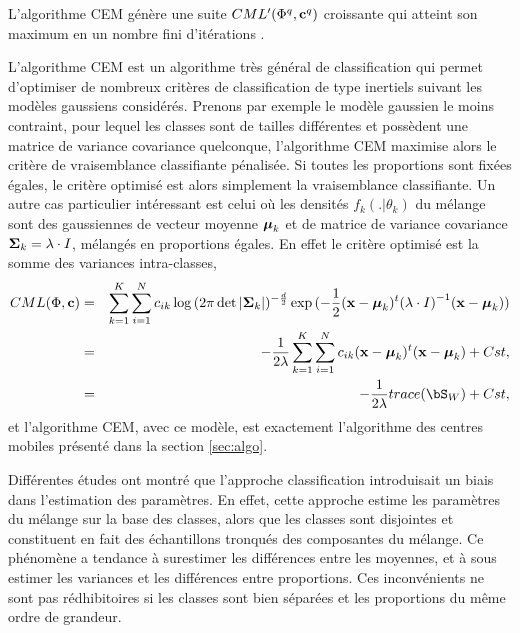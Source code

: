 L'algorithme CEM g\'en\`ere une suite $CML'(\Phi^q,\mbox{\bf c}^q)$ croissante qui
atteint son maximum en un nombre fini d'it\'erations \cite{Celeux1992a}.




L'algorithme CEM est un algorithme tr\`es g\'en\'eral de classification
qui permet d'optimiser de nombreux crit\`eres de classification de 
type inertiels suivant les mod\`eles gaussiens consid\'er\'es.
Prenons par exemple le mod\`ele 
gaussien le moins contraint, pour lequel les classes sont de tailles 
diff\'erentes et poss\`edent une
matrice de variance covariance quelconque,
l'algorithme CEM maximise alors le crit\`ere
de vraisemblance classifiante p\'enalis\'ee. Si toutes les proportions
sont fix\'ees \'egales, le crit\`ere optimis\'e est alors simplement
la vraisemblance classifiante. Un autre cas particulier int\'eressant
est celui o\`u les densit\'es $f_k(.|\theta_k)$ du m\'elange sont des
gaussiennes de vecteur moyenne $\mbox{\boldmath $\mu$}_k$ et de matrice de variance covariance
$\mbox{\boldmath $\Sigma$}_k=\lambda \cdot I$, m\'elang\'es en proportions \'egales. En 
effet le crit\`ere optimis\'e est la somme des variances intra-classes,
\begin{eqnarray*}
 CML(\Phi,\bc ) & = &  \sum_{k=1}^K \sum_{i=1}^N c_{ik}
                 \log{  (2\pi \det{|\bSigma_k|})^{-\frac{d}{2}}
                 \exp{(-\frac{1}{2}(\x-\bmu_k)^t{(\lambda \cdot I)}^{-1} (\x-\bmu_k))}}\\
             & = &  -\frac{1}{2 \lambda}\sum_{k=1}^K \sum_{i=1}^N c_{ik}
                 (\x-\bmu_k)^t (\x-\bmu_k) + Cst,\\
            & = & -\frac{1}{2 \lambda} trace(\bS_W) + Cst, 
\end{eqnarray*}
et l'algorithme CEM,  avec ce mod\`ele, est exactement l'algorithme des
centres mobiles pr\'esent\'e dans la section \ref{sec:algo}. 

Diff\'erentes \'etudes \cite{Celeux1992b} ont montr\'e que l'approche classification
introduisait un biais dans l'estimation des param\`etres. En effet, cette approche
estime les param\`etres du m\'elange sur la base des classes, alors que les classes
sont disjointes et constituent en fait des \'echantillons tronqu\'es des
composantes du m\'elange. Ce ph\'enom\`ene a tendance \`a surestimer les diff\'erences
entre les moyennes, et \`a sous estimer les variances et les diff\'erences entre 
proportions. Ces inconv\'enients ne sont pas r\'edhibitoires si les classes
sont bien s\'epar\'ees et les proportions du m\^eme ordre de grandeur. 





